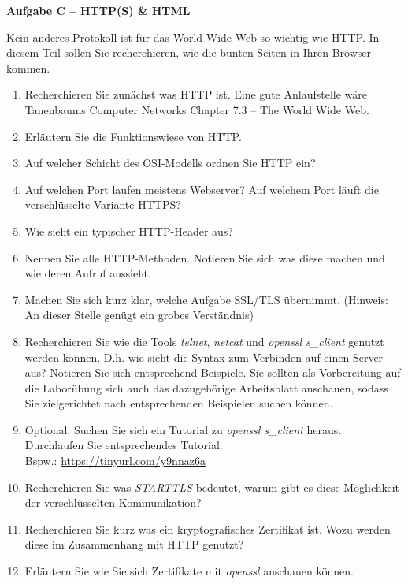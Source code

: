\documentclass[paper=a4,fontsize=11pt]{scrartcl}%
\numberwithin{equation}{section}
\begin{document}
\begin{center}\Large{\textbf{Aufgabe C -- HTTP(S) \& HTML}}\end{center}\vskip0.25in
Kein anderes Protokoll ist für das World-Wide-Web so wichtig wie HTTP. In diesem Teil sollen Sie recherchieren, wie die bunten Seiten in Ihren Browser kommen.
\begin{enumerate}
	\item Recherchieren Sie zunächst was HTTP ist. Eine gute Anlaufstelle wäre Tanenbaums Computer Networks Chapter 7.3 -- The World Wide Web.
	\item Erläutern Sie die Funktionswiese von HTTP.
	\item Auf welcher Schicht des OSI-Modells ordnen Sie HTTP ein?
	\item Auf welchen Port laufen meistens Webserver? Auf welchem Port läuft die verschlüsselte Variante HTTPS?
	\item Wie sieht ein typischer HTTP-Header aus?
	\item Nennen Sie alle HTTP-Methoden. Notieren Sie sich was diese machen und wie deren Aufruf aussieht.
	\item Machen Sie sich kurz klar, welche Aufgabe SSL/TLS übernimmt. (Hinweis: An dieser Stelle genügt ein grobes Verständnis)
	\item Recherchieren Sie wie die Tools \emph{telnet}, \emph{netcat} und \emph{openssl s\_client} genutzt werden können. D.h. wie sieht die Syntax zum Verbinden auf einen Server aus? Notieren Sie sich entsprechend Beispiele. Sie sollten als Vorbereitung auf die Laborübung sich auch das dazugehörige Arbeitsblatt anschauen, sodass Sie zielgerichtet nach entsprechenden Beispielen suchen können.
	\item Optional: Suchen Sie sich ein Tutorial zu \emph{openssl s\_client} heraus. Durchlaufen Sie entsprechendes Tutorial. \\
	Bspw.: \url{https://tinyurl.com/y9nnaz6a}
	\item Recherchieren Sie was \emph{STARTTLS} bedeutet, warum gibt es diese Möglichkeit der verschlüsselten Kommunikation?
	\item Recherchieren Sie kurz was ein kryptografisches Zertifikat ist. Wozu werden diese im Zusammenhang mit HTTP genutzt?
	\item Erläutern Sie wie Sie sich Zertifikate mit \emph{openssl} anschauen können.  
\end{enumerate}
\end{document}
